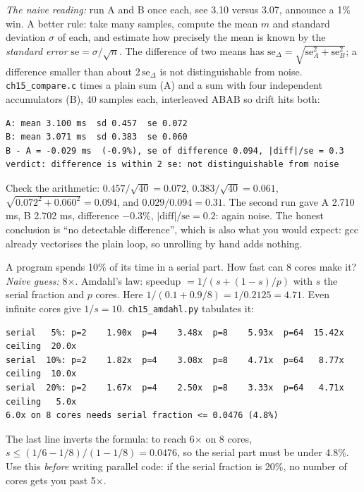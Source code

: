 \begin{example}
\emph{The naive reading:} run A and B once each, see 3.10 versus 3.07,
announce a 1\% win. A better rule: take many samples, compute the
mean $m$ and standard deviation $\sigma$ of each, and estimate how
precisely the mean is known by the \emph{standard error}
$\mathrm{se}=\sigma/\sqrt{n}$. The difference of two means has
$\mathrm{se}_{\Delta}=\sqrt{\mathrm{se}_A^2+\mathrm{se}_B^2}$; a
difference smaller than about $2\,\mathrm{se}_{\Delta}$ is not
distinguishable from noise. \texttt{ch15\_compare.c} times a plain
sum (A) and a sum with four independent accumulators (B), 40 samples
each, interleaved ABAB so drift hits both:

\begin{lstlisting}[basicstyle=\ttfamily\scriptsize,caption={Real output
of \texttt{ch15\_compare} (Linux container, first of two runs).}]
A: mean 3.100 ms  sd 0.457  se 0.072
B: mean 3.071 ms  sd 0.383  se 0.060
B - A = -0.029 ms  (-0.9%), se of difference 0.094, |diff|/se = 0.3
verdict: difference is within 2 se: not distinguishable from noise
\end{lstlisting}
Check the arithmetic: $0.457/\sqrt{40}=0.072$, $0.383/\sqrt{40}=0.061$,
$\sqrt{0.072^2+0.060^2}=0.094$, and $0.029/0.094=0.31$. The second run
gave A 2.710 ms, B 2.702 ms, difference $-0.3\%$, $|\text{diff}|/\text{se}=0.2$:
again noise. The honest conclusion is ``no detectable difference'',
which is also what you would expect: gcc already vectorises the
plain loop, so unrolling by hand adds nothing.
\end{example}

\begin{example}
A program spends 10\% of its time in a serial part. How fast can 8
cores make it? \emph{Naive guess:} 8$\times$. Amdahl's law:
speedup $=1/(s+(1-s)/p)$ with $s$ the serial fraction and $p$ cores.
Here $1/(0.1+0.9/8)=1/0.2125=4.71$. Even infinite cores give
$1/s=10$. \texttt{ch15\_amdahl.py} tabulates it:

\begin{lstlisting}[basicstyle=\ttfamily\scriptsize,caption={Real output of
\texttt{python3 ch15\_amdahl.py}.}]
serial   5%: p=2    1.90x  p=4    3.48x  p=8    5.93x  p=64  15.42x   ceiling  20.0x
serial  10%: p=2    1.82x  p=4    3.08x  p=8    4.71x  p=64   8.77x   ceiling  10.0x
serial  20%: p=2    1.67x  p=4    2.50x  p=8    3.33x  p=64   4.71x   ceiling   5.0x
6.0x on 8 cores needs serial fraction <= 0.0476 (4.8%)
\end{lstlisting}
The last line inverts the formula: to reach 6$\times$ on 8 cores,
$s\le(1/6-1/8)/(1-1/8)=0.0476$, so the serial part must be under
4.8\%. Use this \emph{before} writing parallel code: if the serial
fraction is 20\%, no number of cores gets you past 5$\times$.
\end{example}

